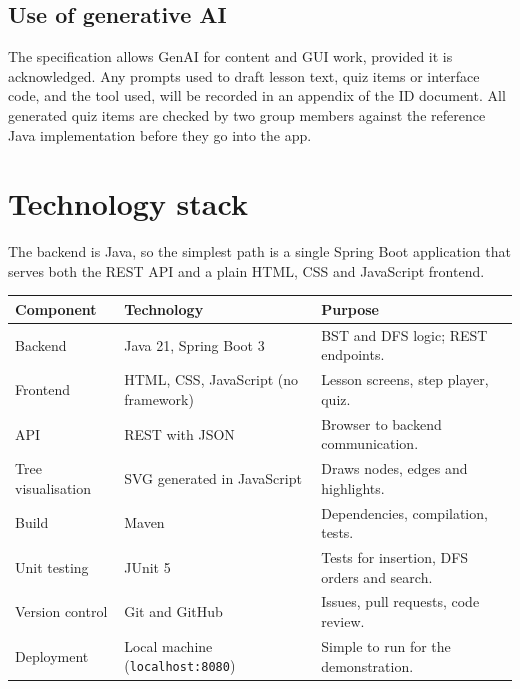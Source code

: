 \documentclass[11pt,a4paper]{article}
\newcommand{\code}[1]{\texttt{#1}}
\begin{document}
\subsection{Use of generative AI}

The specification allows GenAI for content and GUI work, provided it is acknowledged. Any prompts
used to draft lesson text, quiz items or interface code, and the tool used, will be recorded in
an appendix of the ID document. All generated quiz items are checked by two group members
against the reference Java implementation before they go into the app.

\section{Technology stack}

The backend is Java, so the simplest path is a single Spring Boot application that serves both the
REST API and a plain HTML, CSS and JavaScript frontend.

\begin{tabularx}{\textwidth}{@{}l l L@{}}
  \toprule
  \textbf{Component} & \textbf{Technology} & \textbf{Purpose} \\
  \midrule
  Backend            & Java 21, Spring Boot 3          & BST and DFS logic; REST endpoints. \\
  Frontend           & HTML, CSS, JavaScript (no framework) & Lesson screens, step player, quiz. \\
  API                & REST with JSON                  & Browser to backend communication. \\
  Tree visualisation & SVG generated in JavaScript     & Draws nodes, edges and highlights. \\
  Build              & Maven                           & Dependencies, compilation, tests. \\
  Unit testing       & JUnit 5                         & Tests for insertion, DFS orders and search. \\
  Version control    & Git and GitHub                  & Issues, pull requests, code review. \\
  Deployment         & Local machine (\code{localhost:8080}) & Simple to run for the demonstration. \\
  \bottomrule
\end{tabularx}
\end{document}
